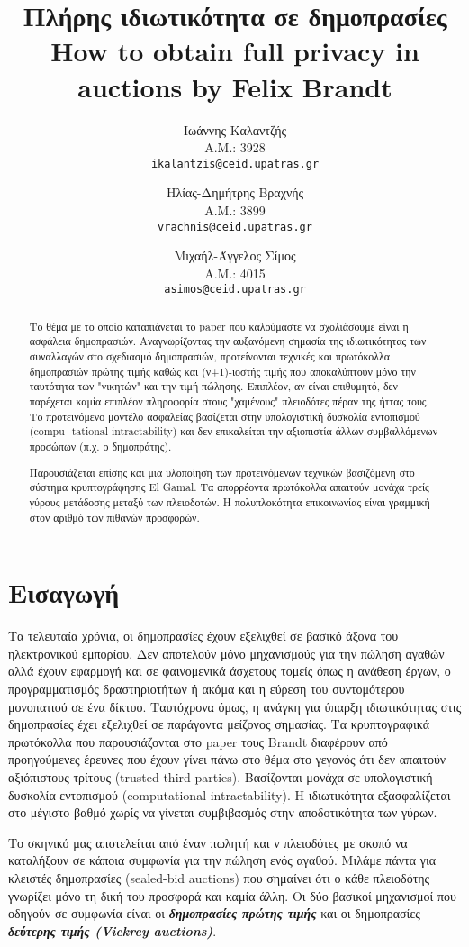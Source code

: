 \documentclass[letterpaper,11pt]{article}
\title{
	Πλήρης ιδιωτικότητα σε δημοπρασίες \\
	\vspace{3mm}
	\normalsize{\textbf{How to obtain full privacy in auctions} by \textbf{Felix Brandt}} \\
}
\author{
	Ιωάννης Καλαντζής\\
	Α.Μ.: 3928\\
	\texttt{ikalantzis@ceid.upatras.gr}
\and
	Ηλίας-Δημήτρης Βραχνής\\
	Α.Μ.: 3899\\
	\texttt{vrachnis@ceid.upatras.gr}
\and
	Μιχαήλ-Άγγελος Σίμος\\
	Α.Μ.: 4015\\
	\texttt{asimos@ceid.upatras.gr}
}
\date{}
\begin{document}
\maketitle

\begin{abstract} Το θέμα με το οποίο καταπιάνεται το paper που καλούμαστε να σχολιάσουμε είναι η ασφάλεια δημοπρασιών. Αναγνωρίζοντας την
αυξανόμενη σημασία της ιδιωτικότητας των συναλλαγών στο σχεδιασμό δημοπρασιών, προτείνονται τεχνικές και πρωτόκολλα δημοπρασιών πρώτης τιμής καθώς
και (ν+1)-ιοστής τιμής που αποκαλύπτουν μόνο την ταυτότητα των "νικητών" και την τιμή πώλησης. Επιπλέον, αν είναι επιθυμητό, δεν παρέχεται καμία
επιπλέον πληροφορία στους "χαμένους" πλειοδότες πέραν της ήττας τους. Το προτεινόμενο μοντέλο ασφαλείας βασίζεται στην υπολογιστική δυσκολία
εντοπισμού (compu- tational intractability) και δεν επικαλείται την αξιοπιστία άλλων συμβαλλόμενων προσώπων (π.χ. ο δημοπράτης).

Παρουσιάζεται επίσης και μια υλοποίηση των προτεινόμενων τεχνικών βασιζόμενη στο σύστημα κρυπτογράφησης El Gamal. Τα απορρέοντα πρωτόκολλα απαιτούν
μονάχα τρείς γύρους μετάδοσης μεταξύ των πλειοδοτών. Η πολυπλοκότητα επικοινωνίας είναι γραμμική στον αριθμό των πιθανών προσφορών. 
\end{abstract}

\section{Εισαγωγή} Τα τελευταία χρόνια, οι δημοπρασίες έχουν εξελιχθεί σε βασικό άξονα του ηλεκτρονικού
εμπορίου. Δεν αποτελούν μόνο μηχανισμούς για την πώληση αγαθών αλλά έχουν εφαρμογή και σε φαινομενικά άσχετους
τομείς όπως η ανάθεση έργων, ο προγραμματισμός δραστηριοτήτων ή ακόμα και η εύρεση του συντομότερου μονοπατιού
σε ένα δίκτυο. Ταυτόχρονα όμως, η ανάγκη για ύπαρξη ιδιωτικότητας στις δημοπρασίες έχει εξελιχθεί σε παράγοντα
μείζονος σημασίας. Τα κρυπτογραφικά πρωτόκολλα που παρουσιάζονται στο paper τους Brandt διαφέρουν από
προηγούμενες έρευνες που έχουν γίνει πάνω στο θέμα στο γεγονός ότι δεν απαιτούν αξιόπιστους τρίτους (trusted
third-parties). Βασίζονται μονάχα σε υπολογιστική δυσκολία εντοπισμού (computational intractability). Η
ιδιωτικότητα εξασφαλίζεται στο μέγιστο βαθμό χωρίς να γίνεται συμβιβασμός στην αποδοτικότητα των γύρων.

Το σκηνικό μας αποτελείται από έναν πωλητή και ν πλειοδότες με σκοπό να καταλήξουν σε κάποια συμφωνία για την
πώληση ενός αγαθού. Μιλάμε πάντα για κλειστές δημοπρασίες (sealed-bid auctions) που σημαίνει ότι ο κάθε
πλειοδότης γνωρίζει μόνο τη δική του προσφορά και καμία άλλη. Οι δύο βασικοί μηχανισμοί που οδηγούν σε
συμφωνία είναι οι \textbf{\emph{δημοπρασίες πρώτης τιμής}} και οι δημοπρασίες \textbf{\emph{δεύτερης τιμής
(Vickrey auctions)}}.
\end{document}
